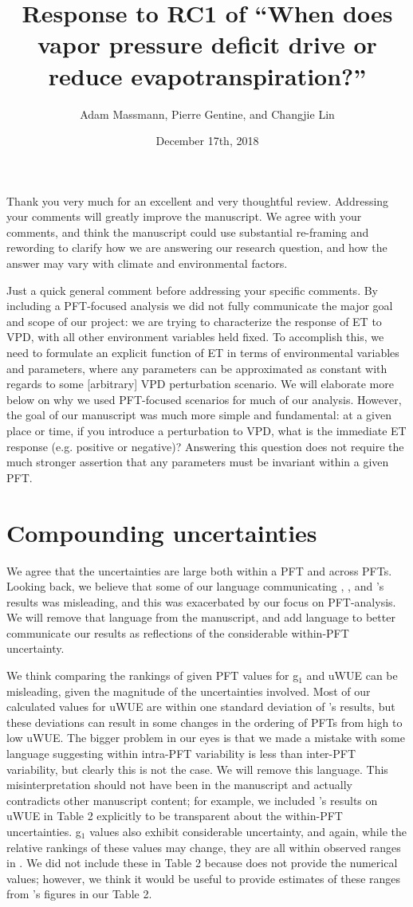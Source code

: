 \documentclass[12pt]{article}
\title{Response to RC1 of ``When does vapor pressure deficit drive or
  reduce evapotranspiration?''}
\author{Adam Massmann, Pierre Gentine, and Changjie Lin}
\date{December 17th, 2018}
\begin{document}
Thank you very much for an excellent and very thoughtful
review. Addressing your comments will greatly improve the
manuscript. We agree with your comments, and think the manuscript
could use substantial re-framing and rewording to clarify how we are
answering our research question, and how the answer may vary with
climate and environmental factors.

Just a quick general comment before addressing your specific
comments. By including a PFT-focused analysis we did not fully
communicate the major goal and scope of our project: we are trying to
characterize the response of ET to VPD, with all other environment
variables held fixed. To accomplish this, we need to formulate an
explicit function of ET in terms of environmental variables and
parameters, where any parameters can be approximated as constant with
regards to some [arbitrary] VPD perturbation scenario. We will
elaborate more below on why we used PFT-focused scenarios for much of
our analysis. However, the goal of our manuscript was much more simple
and fundamental: at a given place or time, if you introduce a
perturbation to VPD, what is the immediate ET response (e.g. positive
or negative)? Answering this question does not require the much
stronger assertion that any parameters must be invariant within a
given PFT.

\section{Compounding uncertainties}

We agree that the uncertainties are large both within a PFT and across
PFTs. Looking back, we believe that some of our language
communicating \cite{Lin_2018}, \cite{Medlyn_2017}, and
\cite{Zhou_2015}'s results was misleading, and this was exacerbated by
our focus on PFT-analysis. We will remove that language from the
manuscript, and add language to better communicate our results as
reflections of the considerable within-PFT uncertainty.

We think comparing the rankings of given PFT values for g$_1$ and uWUE
can be misleading, given the magnitude of the uncertainties
involved. Most of our calculated values for uWUE are within one
standard deviation of \cite{Zhou_2015}'s results, but these deviations
can result in some changes in the ordering of PFTs from high to low
uWUE. The bigger problem in our eyes is that we made a mistake with
some language suggesting within intra-PFT variability is less than
inter-PFT variability, but clearly this is not the case. We will
remove this language. This misinterpretation should not have been in
the manuscript and actually contradicts other manuscript content; for
example, we included \cite{Zhou_2015}'s results on uWUE in Table 2
explicitly to be transparent about the within-PFT uncertainties. g$_1$
values also exhibit considerable uncertainty, and again, while the
relative rankings of these values may change, they are all within
observed ranges in \cite{Medlyn_2017}. We did not include these in
Table 2 because \cite{Medlyn_2017} does not provide the numerical
values; however, we think it would be useful to provide estimates of
these ranges from \cite{Medlyn_2017}'s figures in our Table 2.
\end{document}
